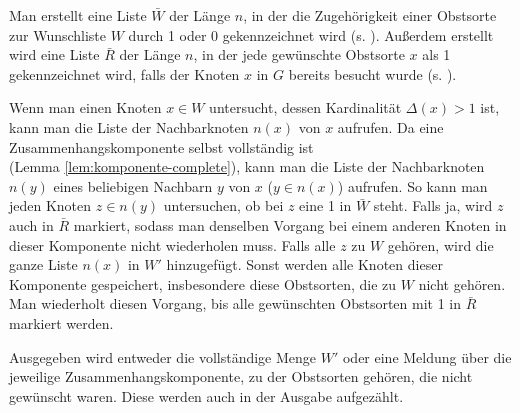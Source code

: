 Man erstellt eine Liste $\bar{W}$ der Länge $n$,
in der die Zugehörigkeit einer Obstsorte zur Wunschliste $W$ durch 1 oder 0 gekennzeichnet wird
(s. ). Außerdem erstellt wird eine Liste $\bar{R}$ der Länge $n$,
in der jede gewünschte Obstsorte $x$ als 1 gekennzeichnet wird, falls der Knoten $x$ in $G$ bereits
besucht wurde (s. ).

Wenn man einen Knoten $x \in W$ untersucht, dessen Kardinalität $\Delta(x) > 1$ ist,
kann man die Liste der Nachbarknoten $n(x)$ von $x$ aufrufen.
Da eine Zusammenhangskomponente selbst vollständig ist\\ (Lemma \ref{lem:komponente-complete}),
kann man die Liste der Nachbarknoten $n(y)$ eines beliebigen Nachbarn $y$ von $x$ ($y \in n(x)$) aufrufen.
So kann man jeden Knoten $z \in n(y)$ untersuchen, ob bei $z$ eine 1 in $\bar{W}$ steht.
Falls ja, wird $z$ auch in $\bar{R}$ markiert,
sodass man denselben Vorgang bei einem anderen Knoten in dieser Komponente nicht wiederholen muss.
Falls alle $z$ zu $W$ gehören, wird
die ganze Liste $n(x)$ in $W'$ hinzugefügt. Sonst werden alle Knoten dieser Komponente 
gespeichert, insbesondere diese Obstsorten, die zu $W$ nicht gehören.\\
Man wiederholt diesen Vorgang, bis alle gewünschten Obstsorten mit 1 in $\bar{R}$ markiert werden.

Ausgegeben wird entweder die vollständige Menge $W'$ oder eine Meldung über die jeweilige 
Zusammenhangskomponente, zu der Obstsorten gehören, die nicht gewünscht waren.
Diese werden auch in der Ausgabe aufgezählt.
